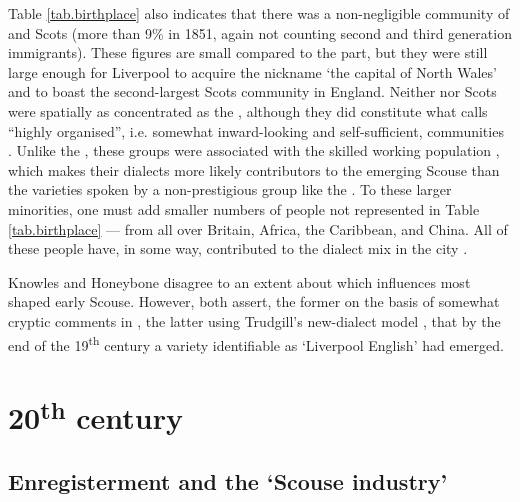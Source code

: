 Table \ref{tab.birthplace} also indicates that there was a non-negligible community of  and Scots (more than 9\% in 1851, again not counting second and third generation immigrants).
These figures are small compared to the  part, but they were still large enough for Liverpool to acquire the nickname `the capital of North Wales' and to boast the second-largest Scots community in England.
Neither  nor Scots were spatially as concentrated as the , although they did constitute what \citeauthor{honeybone2007} calls ``highly organised'', i.e. somewhat inward-looking and self-sufficient, communities \citep[cf.][120--121]{honeybone2007}.
Unlike the , these groups were associated with the skilled working population \citep[cf.][202--203]{belchem2006b}, which makes their dialects more likely contributors to the emerging Scouse than the varieties spoken by a non-prestigious group like the .
To these larger minorities, one must add smaller numbers of people not represented in Table \ref{tab.birthplace} --- from all over Britain, Africa, the Caribbean, and China.
All of these people have, in some way, contributed to the dialect mix in the city \citep[cf.][116]{honeybone2007}.

Knowles and Honeybone disagree to an extent about which influences most shaped early Scouse.
However, both assert, the former on the basis of somewhat cryptic comments in \citealt{ellis1889} \citep[cf.][18]{knowles1973}, the latter using Trudgill's new-dialect model \citep[cf.][118]{honeybone2007}, that by the end of the 19\textsuperscript{th} century a variety identifiable as `Liverpool English' had emerged.

	\section{20\textsuperscript{th} century}\label{sec.hist.20}

		\subsection{Enregisterment and the `Scouse industry'}\label{sec.hist.20.industry}


